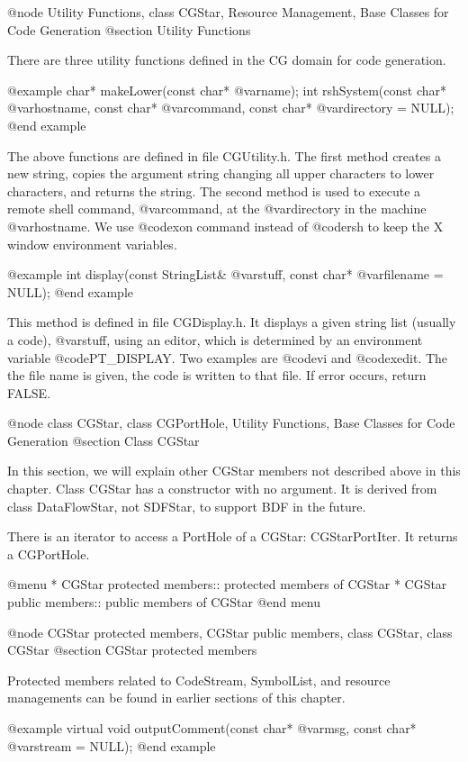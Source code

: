 @node Utility Functions, class CGStar, Resource Management, Base Classes for Code Generation
@section Utility Functions

There are three utility functions defined in the CG domain for code generation.

@example
char* makeLower(const char* @var{name});
int rshSystem(const char* @var{hostname}, const char* @var{command}, const char* @var{directory} = NULL);
@end example

The above functions are defined in file CGUtility.h.
The first method creates a new string, copies the argument
string changing all upper characters to lower characters, and returns the
string. The second method is used to execute a remote shell command,
@var{command}, at the @var{directory} in the machine @var{hostname}. We use
@code{xon} command instead of @code{rsh} to keep the X window environment
variables.

@example
int display(const StringList& @var{stuff}, const char* @var{filename} = NULL);
@end example

This method is defined in file CGDisplay.h. It displays a given string list
(usually a code), @var{stuff}, using an editor, which is determined by
an environment variable @code{PT_DISPLAY}. Two examples are @code{vi} and
@code{xedit}. The the file name is given, the code is written to that file.
If error occurs, return FALSE.

@node class CGStar, class CGPortHole, Utility Functions, Base Classes for Code Generation
@section Class CGStar

In this section, we will explain other CGStar members not described above in
this chapter. Class CGStar has a constructor with no argument. It is derived
from class DataFlowStar, not SDFStar, to support BDF in the future.

There is an iterator to access a PortHole of a CGStar: CGStarPortIter. It
returns a CGPortHole.

@menu
* CGStar protected members::		protected members of CGStar
* CGStar public members::		public members of CGStar
@end menu

@node CGStar protected members, CGStar public members, class CGStar, class CGStar
@section CGStar protected members

Protected members related to CodeStream, SymbolList, and resource
managements can be found in earlier sections of this chapter.

@example
virtual void outputComment(const char* @var{msg}, const char* @var{stream} = NULL);
@end example

